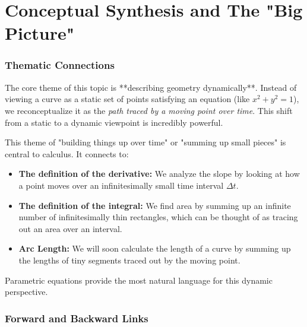 \documentclass{article}
\begin{document}
\part*{Conceptual Synthesis and The "Big Picture"}

\section{Thematic Connections}

The core theme of this topic is **describing geometry dynamically**. Instead of viewing a curve as a static set of points satisfying an equation (like $x^2+y^2=1$), we reconceptualize it as the \textit{path traced by a moving point over time}. This shift from a static to a dynamic viewpoint is incredibly powerful.

This theme of "building things up over time" or "summing up small pieces" is central to calculus. It connects to:
\begin{itemize}
    \item \textbf{The definition of the derivative:} We analyze the slope by looking at how a point moves over an infinitesimally small time interval $\Delta t$.
    \item \textbf{The definition of the integral:} We find area by summing up an infinite number of infinitesimally thin rectangles, which can be thought of as tracing out an area over an interval.
    \item \textbf{Arc Length:} We will soon calculate the length of a curve by summing up the lengths of tiny segments traced out by the moving point.
\end{itemize}
Parametric equations provide the most natural language for this dynamic perspective.

\section{Forward and Backward Links}
\end{document}
